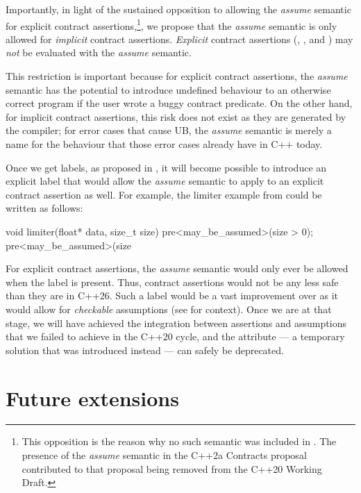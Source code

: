 Importantly, in light of the sustained opposition to allowing the \emph{assume} semantic for explicit contract assertions,\footnote{This opposition is the reason why  no such semantic was included in \cite{P2900R14}. The presence of the \emph{assume} semantic in the C++2a Contracts proposal \cite{P0542R5} contributed to that proposal being removed from the C++20 Working Draft.}, we propose that the \emph{assume} semantic is only allowed for \emph{implicit} contract assertions. \emph{Explicit} contract assertions (, , and ) may \emph{not} be evaluated with the \emph{assume} semantic.

This restriction is important because for explicit contract assertions, the \emph{assume} semantic  has the potential to introduce undefined behaviour to an otherwise correct program if the user wrote a buggy contract predicate. On the other hand, for implicit contract assertions, this risk does not exist as they are generated by the compiler; for error cases that cause UB, the \emph{assume} semantic is merely a name for the behaviour that those error cases already have in C++ today.

Once we get labels, as proposed in \cite{P3400R1}, it will become possible to introduce an explicit label that would allow the \emph{assume} semantic to apply to an explicit contract assertion as well. For example, the limiter example from \cite{P1774R8} could be written as follows:
\begin{codeblock}
void limiter(float* data, size_t size)
  pre<may_be_assumed>(size > 0);
  pre<may_be_assumed>(size %
\end{codeblock}
For explicit contract assertions, the \emph{assume} semantic would only ever be allowed when the \mbox{} label is present. Thus, contract assertions would not be any less safe than they are in C++26. Such a label would be a vast improvement over \tcode{[[assume]]} as it would allow for \emph{checkable} assumptions (see \cite{P2064R0} for context). Once we are at that stage, we will have achieved the integration between assertions and assumptions that we failed to achieve in the C++20 cycle, and the \tcode{[[assume]]} attribute --- a temporary solution that was introduced instead --- can safely be deprecated.

\section{Future extensions}
\label{ext}

